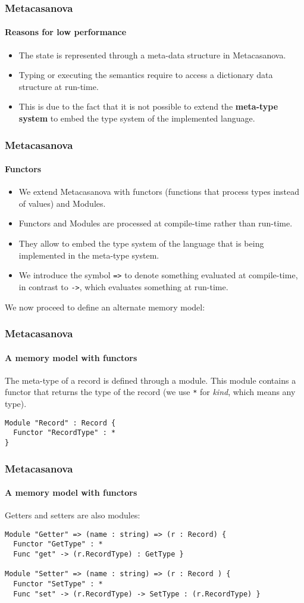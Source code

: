 \documentclass[10pt,a4paper]{beamer}
\begin{document}
\begin{frame}
\frametitle{Metacasanova}
\framesubtitle{Reasons for low performance}

\begin{itemize}
	\item The state is represented through a meta-data structure in Metacasanova.
	\item Typing or executing the semantics require to access a dictionary data structure at run-time.
	\item This is due to the fact that it is not possible to extend the \textbf{meta-type system} to embed the type system of the implemented language.
\end{itemize}
\end{frame}

\begin{frame}
\frametitle{Metacasanova}
\framesubtitle{Functors}

\begin{itemize}
	\item We extend Metacasanova with functors (functions that process types instead of values) and Modules.
	\item Functors and Modules are processed at compile-time rather than run-time.
	\item They allow to embed the type system of the language that is being implemented in the meta-type system.
	\item We introduce the symbol \texttt{=>} to denote something evaluated at compile-time, in contrast to \texttt{->}, which evaluates something at run-time.
\end{itemize}

We now proceed to define an alternate memory model:
\end{frame}

\begin{frame}[fragile]
\frametitle{Metacasanova}
\framesubtitle{A memory model with functors}

The meta-type of a record is defined through a module. This module contains a functor that returns the type of the record (we use \texttt{*} for \textit{kind}, which means any type).

\begin{lstlisting}
Module "Record" : Record {
  Functor "RecordType" : *
}
\end{lstlisting}
\end{frame}

\begin{frame}[fragile]
\frametitle{Metacasanova}
\framesubtitle{A memory model with functors}

Getters and setters are also modules:
\begin{lstlisting}
Module "Getter" => (name : string) => (r : Record) {
  Functor "GetType" : *
  Func "get" -> (r.RecordType) : GetType }

Module "Setter" => (name : string) => (r : Record ) {
  Functor "SetType" : *
  Func "set" -> (r.RecordType) -> SetType : (r.RecordType) }
\end{lstlisting}
\end{frame}
\end{document}
